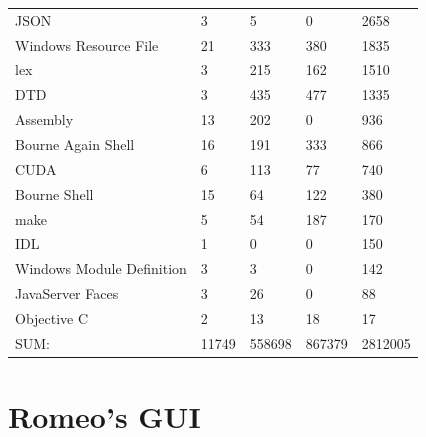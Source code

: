 \begin{appendix}
\begin{table}[htbp]
\begin{longtable}{ l|l|l|l|l }
        JSON                                  &   3         &     5         &     0        &   2658\\
        Windows Resource File                 &  21         &   333         &   380        &   1835\\
        lex                                   &   3         &   215         &   162        &   1510\\
        DTD                                   &   3         &   435         &   477        &   1335\\
        Assembly                              &  13         &   202         &     0        &    936\\
        Bourne Again Shell                    &  16         &   191         &   333        &    866\\
        CUDA                                  &   6         &   113         &    77        &    740\\
        Bourne Shell                          &  15         &    64         &   122        &    380\\
        make                                  &   5         &    54         &   187        &    170\\
        IDL                                   &   1         &     0         &     0        &    150\\
        Windows Module Definition             &   3         &     3         &     0        &    142\\
        JavaServer Faces                      &   3         &    26         &     0        &     88\\
        Objective C                           &   2         &    13         &    18        &     17\\
        \hline
        SUM:                                 &11749         &558698         &867379        &2812005\\
        \hline
    \end{longtable}
    \normalfont
    \label{table:VTKStatistic}
\end{table}

\section{Romeo's GUI}


\end{appendix}

